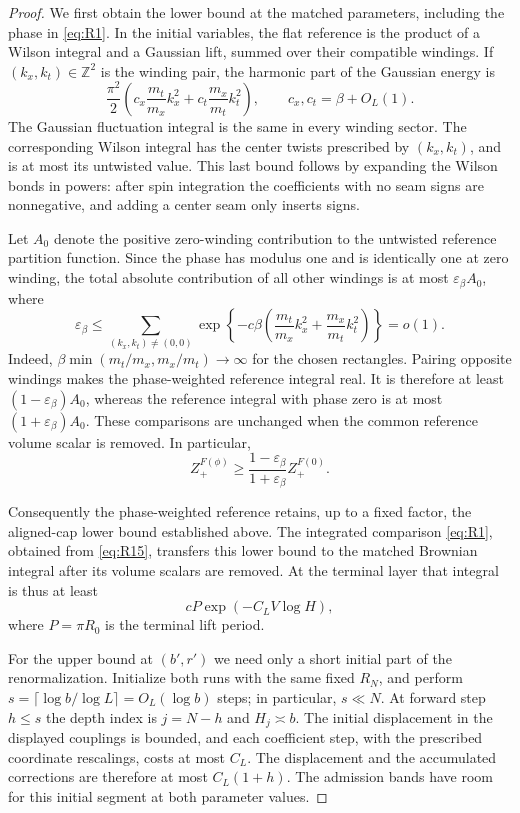 \begin{proof}
We first obtain the lower bound at the matched parameters, including the
phase in \eqref{eq:R1}.  In the initial variables, the flat reference is
the product of a Wilson integral and a Gaussian lift, summed over their
compatible windings.  If $(k_x,k_t)\in\mathbb Z^2$ is the winding pair,
the harmonic part of the Gaussian energy is
\[
  \frac{\pi^2}{2}
  \left(c_x\frac{m_t}{m_x}k_x^2+
        c_t\frac{m_x}{m_t}k_t^2\right),
  \qquad c_x,c_t=\beta+O_L(1).
\]
The Gaussian fluctuation integral is the same in every winding sector.
The corresponding Wilson integral has the center twists prescribed by
$(k_x,k_t)$, and is at most its untwisted value.  This last bound follows
by expanding the Wilson bonds in powers: after spin integration the
coefficients with no seam signs are nonnegative, and adding a center
seam only inserts signs.

Let $A_0$ denote the positive zero-winding contribution to the untwisted
reference partition function.  Since the phase has modulus one and is
identically one at zero winding, the total absolute contribution of all
other windings is at most $\varepsilon_\beta A_0$, where
\[
  \varepsilon_\beta
  \le \sum_{(k_x,k_t)\ne(0,0)}
       \exp\!\left\{-c\beta\left(
        \frac{m_t}{m_x}k_x^2+
        \frac{m_x}{m_t}k_t^2\right)\right\}=o(1).
\]
Indeed,
$\beta\min(m_t/m_x,m_x/m_t)\to\infty$ for the chosen rectangles.
Pairing opposite windings makes the phase-weighted reference integral
real.  It is therefore at least $(1-\varepsilon_\beta)A_0$, whereas the
reference integral with phase zero is at most
$(1+\varepsilon_\beta)A_0$.  These comparisons are unchanged when the
common reference volume scalar is removed.
In particular,
\[
 Z^{F(\phi)}_+\ge
 \frac{1-\varepsilon_\beta}{1+\varepsilon_\beta}Z^{F(0)}_+.
\]

Consequently the phase-weighted reference retains, up to a fixed factor,
the aligned-cap lower bound established above.  The integrated comparison
\eqref{eq:R1}, obtained from \eqref{eq:R15}, transfers this lower bound
to the matched Brownian integral after its volume scalars are removed.
At the terminal layer that integral is thus at least
\[
  cP\exp(-C_L V\log H),
\]
where $P=\pi R_0$ is the terminal lift period.

For the upper bound at $(b',r')$ we need only a short initial part of the
renormalization.  Initialize both runs with the same fixed $R_N$, and
perform $s=\lceil\log b/\log L\rceil=O_L(\log b)$ steps; in particular,
$s\ll N$.  At forward step $h\le s$ the depth index
is $j=N-h$ and $H_j\asymp b$.  The initial displacement in the displayed
couplings is bounded, and each coefficient step, with the prescribed
coordinate rescalings, costs at most $C_L$.  The displacement and the
accumulated corrections are therefore at most $C_L(1+h)$.  The admission
bands have room for this initial segment at both parameter values.


\end{proof}
